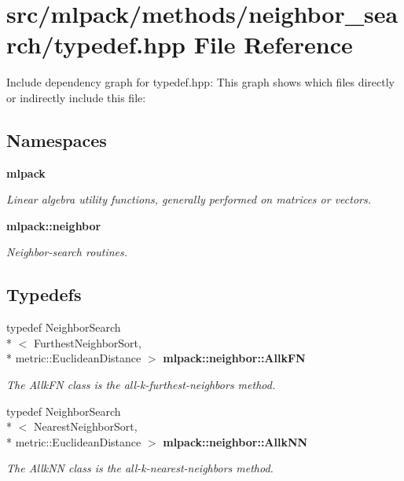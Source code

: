 \section{src/mlpack/methods/neighbor\-\_\-search/typedef.hpp File Reference}
\label{typedef_8hpp}
Include dependency graph for typedef.\-hpp\-:
This graph shows which files directly or indirectly include this file\-:
\subsection*{Namespaces}
\begin{DoxyCompactItemize}
\item 
{\bf mlpack}
\begin{DoxyCompactList}\small\item\em Linear algebra utility functions, generally performed on matrices or vectors. \end{DoxyCompactList}\item 
{\bf mlpack\-::neighbor}
\begin{DoxyCompactList}\small\item\em Neighbor-\/search routines. \end{DoxyCompactList}\end{DoxyCompactItemize}
\subsection*{Typedefs}
\begin{DoxyCompactItemize}
\item 
typedef Neighbor\-Search\\*
$<$ Furthest\-Neighbor\-Sort, \\*
metric\-::\-Euclidean\-Distance $>$ {\bf mlpack\-::neighbor\-::\-Allk\-F\-N}
\begin{DoxyCompactList}\small\item\em The Allk\-F\-N class is the all-\/k-\/furthest-\/neighbors method. \end{DoxyCompactList}\item 
typedef Neighbor\-Search\\*
$<$ Nearest\-Neighbor\-Sort, \\*
metric\-::\-Euclidean\-Distance $>$ {\bf mlpack\-::neighbor\-::\-Allk\-N\-N}
\begin{DoxyCompactList}\small\item\em The Allk\-N\-N class is the all-\/k-\/nearest-\/neighbors method. \end{DoxyCompactList}\end{DoxyCompactItemize}


